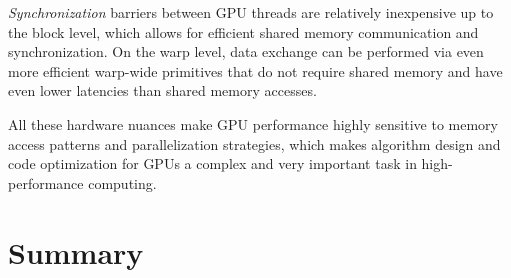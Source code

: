 

\emph{Synchronization} barriers between GPU threads are relatively inexpensive up to the block level, which allows for efficient shared memory communication and synchronization. On the warp level, data exchange can be performed via even more efficient warp-wide primitives that do not require shared memory and have even lower latencies than shared memory accesses.

All these hardware nuances make GPU performance highly sensitive to memory access patterns and parallelization strategies, which makes algorithm design and code optimization for GPUs a complex and very important task in high-performance computing.

\section{Summary}\label{sec:code-optimization-summary}

